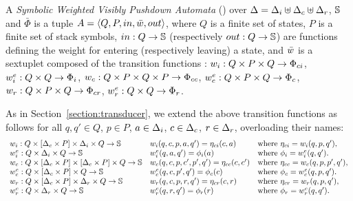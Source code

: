 \begin{definition}
A \emph{Symbolic Weighted Visibly Pushdown Automata} (\SWVPA)
over  $\Delta = \Deltai \uplus \Deltac \uplus \Deltar$, $\mathbb{S}$ and $\bar\Phi$
is a tuple $A = \< Q, P, \init, \bar\wei, \final >$,
where $Q$ is a finite set of states,
$P$ is a finite set of stack symbols,
$\mathsf{in} : Q \to \Semiring$
(respectively $\mathsf{out} : Q \to \Semiring$)
are functions defining the weight for entering
(respectively leaving) a state,
and $\bar\wei$ is a sextuplet composed of the transition functions :
$\weii : Q \times P \times Q \to \Phici$,
$\weiei : Q \times Q \to \Phii$,
$\weic : Q \times P \times Q \times P \to \Phicc$,
$\weiec : Q \times P \times Q \to \Phic$,
$\weir : Q \times P \times Q \to \Phicr$,
$\weier : Q \times Q \to \Phir$.
\end{definition}
%
As in Section~\ref{section:transducer},
we extend the above transition functions as follows
for all $q, q' \in Q$, $p \in P$,
$a \in \Deltai$,
$\call{c} \in \Deltac$,
$\return{r} \in \Deltar$,
overloading their names: %
\[
\begin{array}{lll}
\weii: Q \times [\Deltac \times P] \times \Deltai \times Q \to \Semiring &
\weii(q, c, p, a, q') = \eta_\mathsf{ci}(c, a) &
\mathrm{where~} \eta_\mathsf{ci} = \weii(q, p, q'),\\
%
\weiei: Q \times \Deltai \times Q \to \Semiring &
\weiei(q, a, q') = \phi_\mathsf{i}(a) &
\mathrm{where~} \phi_\mathsf{i} = \weiei(q, q').\\
%
\weic: Q \times [\Deltac \times P] \times  [\Deltac \times P] \times Q \to \Semiring &
\weic(q, c, p, \call{c'}, p', q') = \eta_\mathsf{cc}(c, \call{c'}) &
\mathrm{where~} \eta_\mathsf{cc} = \weic(q, p, p', q'),\\
%
\weiec: Q \times [\Deltac \times P] \times Q \to \Semiring &
\weiec(q, {\call{c}}, p', q') = \phi_\mathsf{c}({\call{c}}) &
\mathrm{where~} \phi_\mathsf{c} = \weiec(q, p, q').\\
%
\weir: Q \times [\Deltac \times P] \times \Deltar \times Q \to \Semiring &
\weir(q, {\call{c}},  p, {\return{r}}, q') = \eta_\mathsf{cr}({\call{c}},  {\return{r}}) &
\mathrm{where~} \eta_\mathsf{cr} = \weir(q, p, q'),\\
%
\weier: Q \times \Deltar \times Q \to \Semiring &
\weier(q, {\return{r}}, q') = \phi_\mathsf{r}({\return{r}}) &
\mathrm{where~} \phi_\mathsf{r} = \weier(q, q').\\
\end{array}
\]

